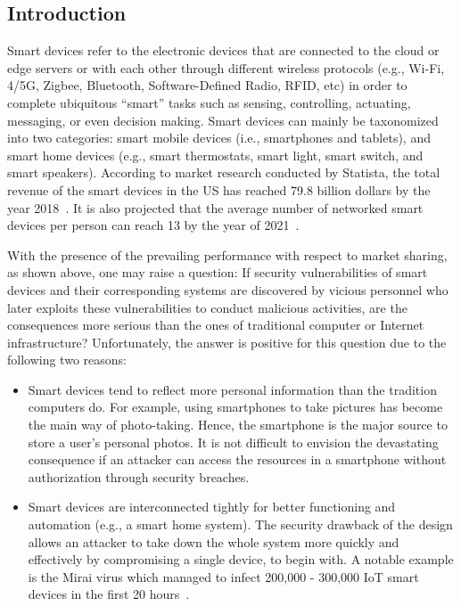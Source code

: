 \documentclass[letterpaper,12pt]{article}
\begin{document}
   \newpage
   \setcounter{page}{1}
   \setcounter{section}{1}
   \begin{singlespace}
       \section{Introduction}
   \end{singlespace}
   \setcounter{section}{1}
   \doublespacing
Smart devices refer to the electronic devices that are connected to the cloud or edge servers or with each other through different wireless protocols (e.g., Wi-Fi, 4/5G, Zigbee, Bluetooth, Software-Defined Radio, RFID, etc) in order to complete ubiquitous ``smart'' tasks such as sensing, controlling, actuating, messaging, or even decision making. Smart devices can mainly be taxonomized into two categories: smart mobile devices (i.e., smartphones and tablets), and smart home devices (e.g., smart thermostats, smart light, smart switch, and smart speakers). According to market research conducted by Statista, the total revenue of the smart devices in the US has reached 79.8 billion dollars by the year 2018~\cite{Statista:smarthome}\cite{statista:smartphone}. It is also projected that the average number of networked smart devices per person can reach 13 by the year of 2021~\cite{smartdeviceperperson}.

With the presence of the prevailing performance with respect to market sharing, as shown above, one may raise a question: If security vulnerabilities of smart devices and their corresponding systems are discovered by vicious personnel who later exploits these vulnerabilities to conduct malicious activities, are the consequences more serious than the ones of traditional computer or Internet infrastructure? Unfortunately, the answer is positive for this question due to the following two reasons:
\begin{itemize}
\item Smart devices tend to reflect more personal information than the tradition computers do. For example, using smartphones to take pictures has become the main way of photo-taking\cite{smartphonephoto}. Hence, the smartphone is the major source to store a user's personal photos. It is not difficult to envision the devastating consequence if an attacker can access the resources in a smartphone without authorization through security breaches.

\item Smart devices are interconnected tightly for better functioning and automation (e.g., a smart home system). The security drawback of the design allows an attacker to take down the whole system more quickly and effectively by compromising a single device, to begin with. A notable example is the Mirai virus which managed to infect 200,000 -
300,000 IoT smart devices in the first 20 hours~\cite{antonakakis2018mirai}.
\end{itemize}
\end{document}
